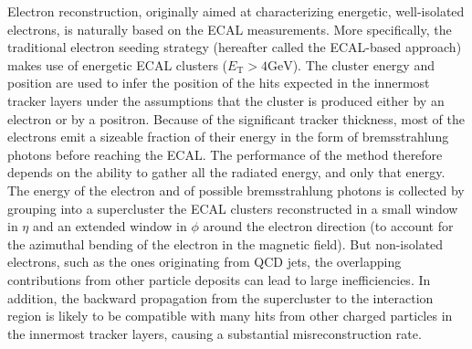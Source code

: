 Electron reconstruction, originally aimed at characterizing energetic, well-isolated electrons, is naturally based on the ECAL measurements. More specifically, the traditional electron seeding strategy (hereafter called the ECAL-based approach) \cite{2015} makes use of energetic ECAL clusters ($E_{\mathrm{T}}>4 \mathrm{GeV}$).  The cluster energy and position are used to infer the position of the hits expected in the innermost tracker layers under the assumptions that the cluster is produced either by an electron or by a positron.  Because of the significant tracker thickness, most of the electrons emit a sizeable fraction of their energy in the form of bremsstrahlung photons before reaching the ECAL. The performance of the method therefore depends on the ability to gather all the radiated energy, and only that energy.  The energy of the electron and of possible bremsstrahlung photons is collected by grouping into a supercluster the ECAL clusters reconstructed in a small window in $\eta$ and an extended window in $\phi$ around the electron direction (to account for the azimuthal bending of the electron in the magnetic field). But non-isolated electrons, such as the ones originating from QCD jets, the overlapping contributions from other particle deposits can lead to large inefficiencies. In addition, the backward propagation from the supercluster to the interaction region is likely to be compatible with many hits from other charged particles in the innermost tracker layers, causing a substantial misreconstruction rate.

